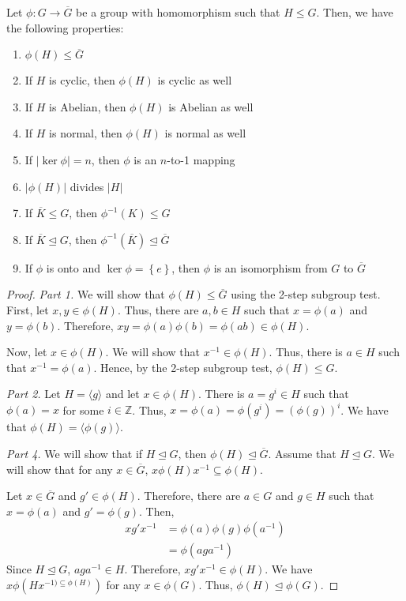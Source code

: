 \begin{theorem}
    Let \(\phi : G \to \overline{G}\) be a group with homomorphism such that \(H \leq G\). Then, we have the following properties:
    \begin{enumerate}
        \item \(\phi(H) \leq \overline{G}\)
        \item If \(H\) is cyclic, then \(\phi(H)\) is cyclic as well
        \item If \(H\) is Abelian, then \(\phi(H)\) is Abelian as well
        \item If \(H\) is normal, then \(\phi(H)\) is normal as well
        \item If \(|\ker\phi| = n\), then \(\phi\) is an \(n\)-to-1 mapping
        \item \(|\phi(H)|\) divides \(|H|\)
        \item If \(\overline{K} \leq G\), then \(\phi^{-1}(K) \leq G\)
        \item If \(\overline{K} \unlhd G\), then \(\phi^{-1}(\overline{K}) \unlhd \overline{G}\)
        \item If \(\phi\) is onto and \(\ker\phi = \left\{e\right\}\), then \(\phi\) is an isomorphism from \(G\) to \(\overline{G}\)
    \end{enumerate}
\end{theorem}

\begin{proof}
    \phantom{gg}

    \textit{Part 1.} We will show that \(\phi(H) \leq \overline{G}\) using the 2-step subgroup test. First, let \(x, y \in \phi(H)\). Thus, there are \(a, b \in H\) such that \(x = \phi(a)\) and \(y = \phi(b)\). Therefore, \(xy = \phi(a)\phi(b) = \phi(ab) \in \phi(H)\).

    Now, let \(x \in \phi(H)\). We will show that \(x^{-1} \in \phi(H)\). Thus, there is \(a \in H\) such that \(x^{-1} = \phi(a)\). Hence, by the 2-step subgroup test, \(\phi(H) \leq G\).

    \textit{Part 2.} Let \(H = \langle g \rangle\) and let \(x \in \phi(H)\). There is \(a = g^i \in H\) such that \(\phi(a) = x\) for some \(i \in \mathbb{Z}\). Thus, \(x = \phi(a) = \phi(g^i) = (\phi(g))^i\). We have that \(\phi(H) = \langle \phi(g) \rangle\).

    \textit{Part 4.} We will show that if \(H \unlhd G\), then \(\phi(H) \unlhd \overline{G}\). Assume that \(H \unlhd G\). We will show that for any \(x \in \overline{G}\), \(x\phi(H)x^{-1} \subseteq \phi(H)\). 

    Let \(x \in \overline{G}\) and \(g' \in \phi(H)\). Therefore, there are \(a \in G\) and \(g \in H\) such that \(x = \phi(a)\) and \(g' = \phi(g)\). Then,
    \[
    \begin{aligned}
        xg'x^{-1} &= \phi(a) \phi(g) \phi(a^{-1}) \\
                  &= \phi(aga^{-1})
    \end{aligned}
    \]
    Since \(H \unlhd G\), \(aga^{-1} \in H\). Therefore, \(xg'x^{-1} \in \phi(H)\). We have \(x\phi(Hx^{-1) \subseteq \phi(H)})\) for any \(x \in \phi(G)\). Thus, \(\phi(H) \unlhd \phi(G)\).
\end{proof}
